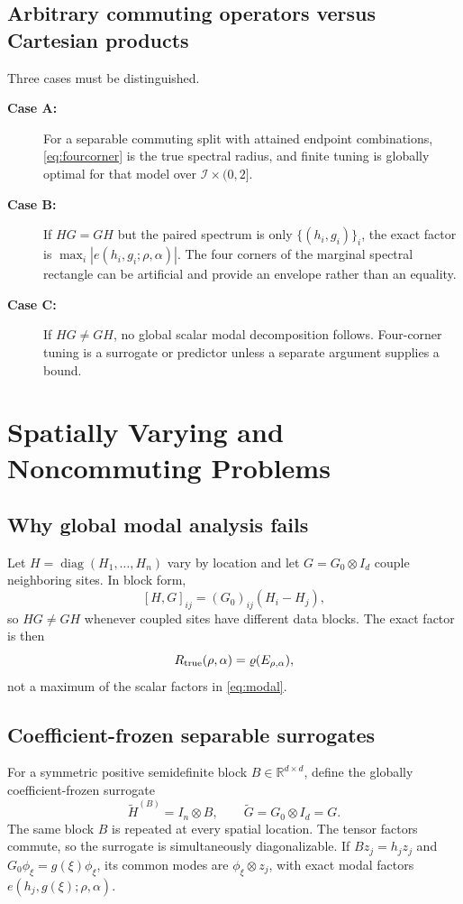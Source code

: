 \documentclass[11pt]{article}
\theoremstyle{definition}
\newcommand{\R}{\mathbb{R}}
\newcommand{\spr}{\varrho}
\newcommand{\diag}{\operatorname{diag}}
\begin{document}
\subsection{Arbitrary commuting operators versus Cartesian products}
Three cases must be distinguished.
\begin{description}
\item[\textbf{Case A:}] For a separable commuting split with attained endpoint combinations,
\eqref{eq:fourcorner} is the true spectral radius, and finite tuning is globally
optimal for that model over $\mathcal I\times(0,2]$.
\item[\textbf{Case B:}] If $HG=GH$ but the paired spectrum is only
$\{(h_i,g_i)\}_i$, the exact factor is
$\max_i|e(h_i,g_i;\rho,\alpha)|$. The four corners of the marginal spectral
rectangle can be artificial and provide an envelope rather than an equality.
\item[\textbf{Case C:}] If $HG\ne GH$, no global scalar modal decomposition follows. Four-corner
tuning is a surrogate or predictor unless a separate argument supplies a
bound.
\end{description}

\section{Spatially Varying and Noncommuting Problems}\label{sec:noncommuting}
\subsection{Why global modal analysis fails}
Let $H=\diag(H_1,\ldots,H_n)$ vary by location and let
$G=G_0\otimes I_d$ couple neighboring sites. In block form,
\[
[H,G]_{ij}=(G_0)_{ij}(H_i-H_j),
\]
so $HG\ne GH$ whenever coupled sites have different data blocks. The exact
factor is then
\[
R_{\rm true}(\rho,\alpha)=\spr(E_{\rho,\alpha}),
\]
not a maximum of the scalar factors in \eqref{eq:modal}.

\subsection{Coefficient-frozen separable surrogates}
For a symmetric positive semidefinite block $B\in\R^{d\times d}$, define the
globally coefficient-frozen surrogate
\[
\widetilde H^{(B)}=I_n\otimes B,\qquad
\widetilde G=G_0\otimes I_d=G.
\]
The same block $B$ is repeated at every spatial location. The tensor factors
commute, so the surrogate is simultaneously diagonalizable. If $Bz_j=h_jz_j$
and $G_0\phi_\xi=g(\xi)\phi_\xi$, its common modes are
$\phi_\xi\otimes z_j$, with exact modal factors
$e(h_j,g(\xi);\rho,\alpha)$.
\end{document}
